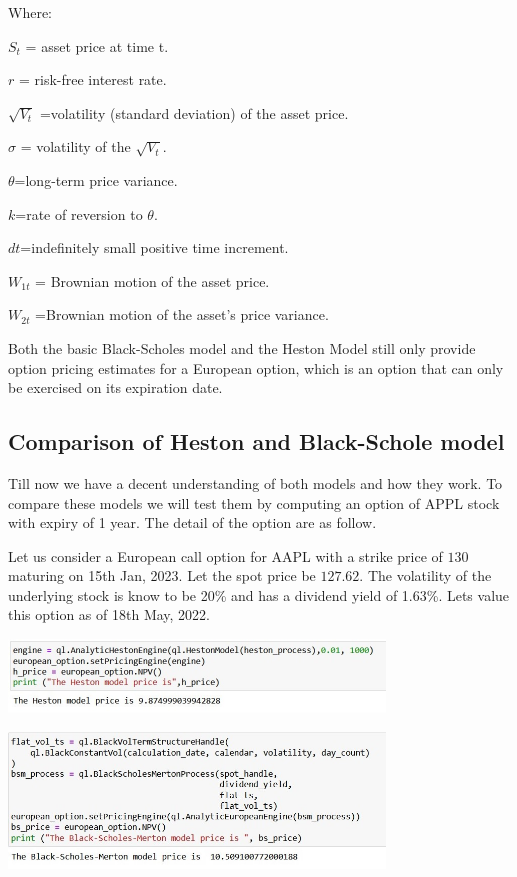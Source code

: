 \documentclass[12pt]{article}
\begin{document}
Where:

$S_t$ = asset price at time t.

$r$   =  risk-free interest rate.


$\sqrt{V_t}$ =volatility (standard deviation) of the asset price.

$\sigma$     = volatility of the $\sqrt{V_t}$.

$\theta$=long-term price variance.

$k$=rate of reversion to $\theta$.

$dt$=indefinitely small positive time increment.

$W_{1t}$ = Brownian motion of the asset price.

$W_{2t}$ =Brownian motion of the asset’s price variance.​


Both the basic Black-Scholes model and the Heston Model still only provide option pricing estimates for a European option, which is an option that can only be exercised on its expiration date. \cite{bworld5}

\subsection{Comparison of Heston and Black-Schole model}

Till now we have a decent understanding of both models and how they work. To compare these models we will test them by computing an option of APPL stock with expiry of 1 year. The detail of the option are as follow.

Let us consider a European call option for AAPL with a strike price of $130$ maturing on 15th Jan, 2023. Let the spot price be $127.62$. The volatility of the underlying stock is know to be 20\%  and has a dividend yield of 1.63\%. Lets value this option as of 18th May, 2022.

\includegraphics[width=10cm]{p9}


\includegraphics[width=10cm]{p10}
\end{document}
